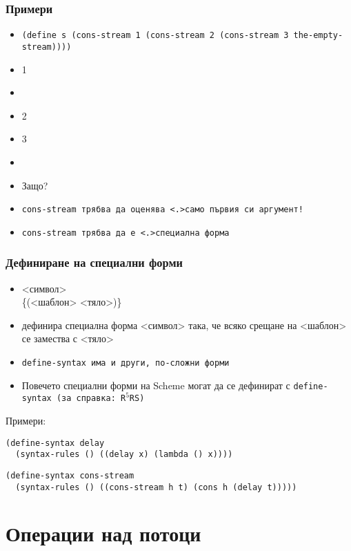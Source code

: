 \documentclass{beamer}
\begin{document}
\begin{frame}
  \frametitle{Примери}
  \begin{itemize}[<+->]
  \item \tt{(define s (cons-stream 1 (cons-stream 2 (cons-stream 3 the-empty-stream))))}
  \item {}1
  \item {}
  \item {}2
  \item {}3
  \item {}
  \item<+-| alert@+>Защо?
  \item \tt{cons-stream} трябва да оценява \alert<.>{само първия си аргумент}!
  \item \tt{cons-stream} трябва да е \alert<.>{специална форма}
  \end{itemize}
\end{frame}

\begin{frame}[fragile]
  \frametitle{Дефиниране на специални форми}
  \begin{itemize}[<+->]
  \item {} <символ>\\
    \hspace{5ex}\{\tta(<шаблон> <тяло>\tta)\}\tta{))}
  \item дефинира специална форма <символ> така, че всяко срещане на <шаблон> се замества с <тяло>
  \item \tt{define-syntax} има и други, по-сложни форми
  \item Повечето специални форми на Scheme могат да се дефинират с \tt{define-syntax} (за справка: R$^5$RS)
  \end{itemize}
  \onslide<+->
  Примери:
  \onslide<+->
\begin{verbatim}
(define-syntax delay
  (syntax-rules () ((delay x) (lambda () x))))
\end{verbatim}
  \onslide<+->
\begin{verbatim}
(define-syntax cons-stream
  (syntax-rules () ((cons-stream h t) (cons h (delay t)))))
\end{verbatim}
\end{frame}

\section{Операции над потоци}
\end{document}
